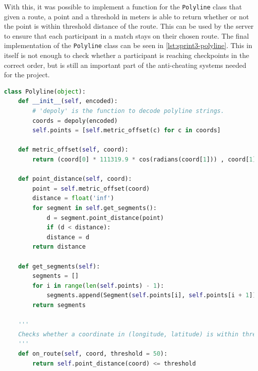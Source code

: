 With this, it was possible to implement a function for the \texttt{Polyline} class that given a route, a point and a threshold in meters is able to return whether or not the point is within threshold distance of the route. This can be used by the server to ensure that each participant in a match stays on their chosen route. The final implementation of the \texttt{Polyline} class can be seen in \autoref{lst:sprint3-polyline}. This in itself is not enough to check whether a participant is reaching checkpoints in the correct order, but is still an important part of the anti-cheating systems needed for the project.

\begin{lstlisting}[label={lst:sprint3-polyline},caption={The Polyline Class.},language={Python}]
class Polyline(object):
	def __init__(self, encoded):
		# 'depoly' is the function to decode polyline strings.
		coords = depoly(encoded)
		self.points = [self.metric_offset(c) for c in coords]

	def metric_offset(self, coord):
		return (coord[0] * 111319.9 * cos(radians(coord[1])) , coord[1] * 111319.9)
        
	def point_distance(self, coord):
		point = self.metric_offset(coord)
		distance = float('inf')
		for segment in self.get_segments():
			d = segment.point_distance(point)
			if (d < distance):
			distance = d
		return distance

	def get_segments(self):
		segments = []
		for i in range(len(self.points) - 1):
			segments.append(Segment(self.points[i], self.points[i + 1]))
		return segments
       
	'''
	Checks whether a coordinate in (longitude, latitude) is within threshold in meters of the polyline.
	'''
	def on_route(self, coord, threshold = 50):
		return self.point_distance(coord) <= threshold
\end{lstlisting}